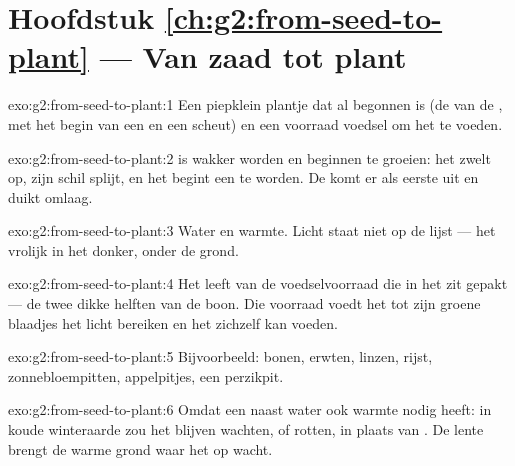 \section*{Hoofdstuk \ref{ch:g2:from-seed-to-plant} --- Van zaad tot plant}

\begin{solution}{exo:g2:from-seed-to-plant:1}
Een piepklein plantje dat al begonnen is (de  van de , met het
begin van een  en een scheut) en een voorraad voedsel om het te voeden.
\end{solution}

\begin{solution}{exo:g2:from-seed-to-plant:2}
 is wakker worden en beginnen te groeien: het  zwelt op,
zijn schil splijt, en het begint een  te worden. De  komt er
als eerste uit en duikt omlaag.
\end{solution}

\begin{solution}{exo:g2:from-seed-to-plant:3}
Water en warmte. Licht staat niet op de lijst --- het  
vrolijk in het donker, onder de grond.
\end{solution}

\begin{solution}{exo:g2:from-seed-to-plant:4}
Het leeft van de voedselvoorraad die in het  zit gepakt --- de twee
dikke helften van de boon. Die voorraad voedt het  tot zijn
groene blaadjes het licht bereiken en het zichzelf kan voeden.
\end{solution}

\begin{solution}{exo:g2:from-seed-to-plant:5}
Bijvoorbeeld: bonen, erwten, linzen, rijst, zonnebloempitten,
appelpitjes, een perzikpit.
\end{solution}

\begin{solution}{exo:g2:from-seed-to-plant:6}
Omdat een  naast water ook warmte nodig heeft: in koude winteraarde
zou het blijven wachten, of rotten, in plaats van . De lente
brengt de warme grond waar het  op wacht.
\end{solution}

